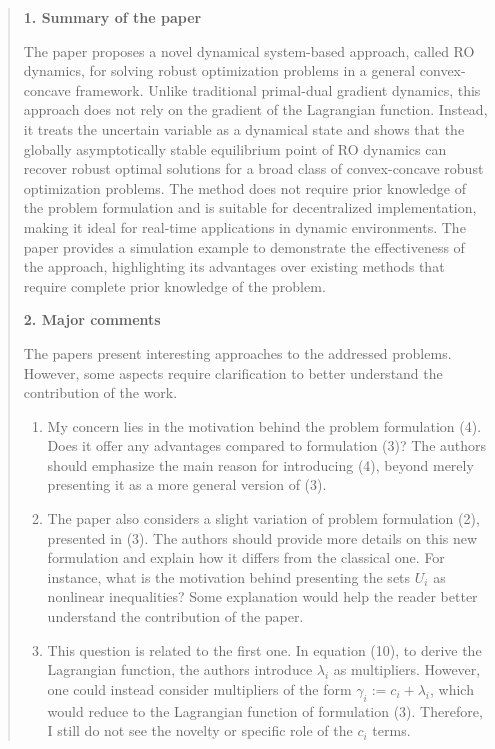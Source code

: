 \documentclass[journal,twoside,web]{ieeecolor}
\begin{document}
\begin{quote}
\textbf{1. Summary of the paper}

The paper proposes a novel dynamical system-based approach, called RO dynamics, for solving robust optimization problems in a general convex-concave framework. Unlike traditional primal-dual gradient dynamics, this approach does not rely on the gradient of the Lagrangian function. Instead, it treats the uncertain variable as a dynamical state and shows that the globally asymptotically stable equilibrium point of RO dynamics can recover robust optimal solutions for a broad class of convex-concave robust optimization problems. The method does not require prior knowledge of the problem formulation and is suitable for decentralized implementation, making it ideal for real-time applications in dynamic environments. The paper provides a simulation example to demonstrate the effectiveness of the approach, highlighting its advantages over existing methods that require complete prior knowledge of the problem.

\textbf{2. Major comments}

The papers present interesting approaches to the addressed problems. However, some aspects require clarification to better understand the contribution of the work.

\begin{enumerate}
\item My concern lies in the motivation behind the problem formulation (4). Does it offer any advantages compared to formulation (3)? The authors should emphasize the main reason for introducing (4), beyond merely presenting it as a more general version of (3).

\item The paper also considers a slight variation of problem formulation (2), presented in (3). The authors should provide more details on this new formulation and explain how it differs from the classical one. For instance, what is the motivation behind presenting the sets $U_i$ as nonlinear inequalities? Some explanation would help the reader better understand the contribution of the paper.

\item This question is related to the first one. In equation (10), to derive the Lagrangian function, the authors introduce $\lambda_i$ as multipliers. However, one could instead consider multipliers of the form $\gamma_i := c_i + \lambda_i$, which would reduce to the Lagrangian function of formulation (3). Therefore, I still do not see the novelty or specific role of the $c_i$ terms.


\end{enumerate}
\end{quote}
\end{document}
